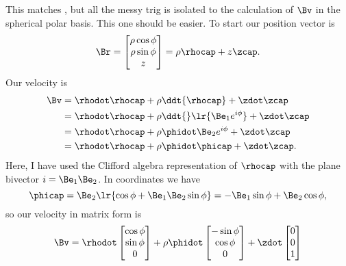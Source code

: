 {This matches , but all the messy trig is isolated to the calculation of \(\Bv\) in the spherical polar basis.
%
%
This one should be easier.  To start our position vector is
%
\begin{equation}\label{eqn:classicalMechanicsPs2:90}
\Br =
\begin{bmatrix}
\rho \cos\phi \\
\rho \sin\phi \\
z
\end{bmatrix}
= \rho \rhocap + z \zcap.
\end{equation}
%
Our velocity is
%
\begin{equation}\label{eqn:classicalMechanicsPs2:1110}
\begin{aligned}
\Bv
&= \rhodot \rhocap + \rho \ddt{\rhocap} + \zdot \zcap \\
&= \rhodot \rhocap + \rho \ddt{}
\lr{ \Be_1 e^{i\phi} }
 + \zdot \zcap \\
&= \rhodot \rhocap + \rho \phidot \Be_2 e^{i\phi} + \zdot \zcap \\
&= \rhodot \rhocap + \rho \phidot \phicap + \zdot \zcap .
\end{aligned}
\end{equation}
%
Here, I have used the Clifford algebra representation of \(\rhocap\) with the plane bivector \(i = \Be_1 \Be_2\).  In coordinates we have
%
\begin{equation}\label{eqn:classicalMechanicsPs2:110}
\phicap = \Be_2
\lr{ \cos\phi + \Be_1 \Be_2 \sin\phi }
 = -\Be_1 \sin\phi + \Be_2 \cos\phi,
\end{equation}
%
so our velocity in matrix form is
\begin{equation}\label{eqn:classicalMechanicsPs2:130}
\begin{aligned}
   \Bv
   &= \rhodot
\begin{bmatrix}
\cos\phi \\
\sin\phi \\
0
\end{bmatrix}
+
\rho \phidot
\begin{bmatrix}
-\sin\phi \\
\cos\phi \\
0
\end{bmatrix}
+
\zdot
\begin{bmatrix}
0 \\
0 \\
1
\end{bmatrix} \\

\end{aligned}
\end{equation}}
